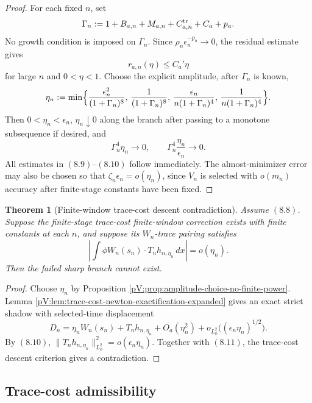 \documentclass[11pt]{article}
\numberwithin{equation}{section}
\theoremstyle{plain}
\newtheorem{theorem}{Theorem}[section]
\theoremstyle{definition}
\theoremstyle{remark}
\begin{document}
\begin{proof}
For each fixed \(n\), set
\[
        \Gamma_n:=1+B_{a,n}+M_{a,n}+C^{\rm tr}_{a,n}+C_a+p_a.
\]
No growth condition is imposed on \(\Gamma_n\).  Since \(\rho_n\epsilon_n^{-p_a}\to0\), the residual estimate gives
\[
        r_{a,n}(\eta)\le C_a'\eta
\]
for large \(n\) and \(0<\eta<1\).  Choose the explicit amplitude, after \(\Gamma_n\) is known,
\[
        \eta_n
        :=\min\Bigl\{
        \frac{\epsilon_n^2}{(1+\Gamma_n)^8},\,
        \frac{1}{(1+\Gamma_n)^8},\,
        \frac{\epsilon_n}{n(1+\Gamma_n)^4},\,
        \frac{1}{n(1+\Gamma_n)^4}
        \Bigr\}.
\]
Then \(0<\eta_n<\epsilon_n\), \(\eta_n\downarrow0\) along the branch after passing to a monotone subsequence if desired, and
\[
        \Gamma_n^4\eta_n\to0,
        \qquad
        \Gamma_n^4\frac{\eta_n}{\epsilon_n}\to0.
\]
All estimates in \((8.9)\)--\((8.10)\) follow immediately.  The almost-minimizer error may also be chosen so that \(\zeta_n\epsilon_n=o(\eta_n)\), since \(V_n\) is selected with \(o(m_n)\) accuracy after finite-stage constants have been fixed.
\end{proof}

\begin{theorem}[Finite-window trace-cost descent contradiction]
\label{pV:thm:finite-window-trace-cost-descent-expanded}
Assume \((8.8)\).  Suppose the finite-stage trace-cost finite-window correction exists with finite constants at each \(n\), and suppose its \(W_n\)-trace pairing satisfies
\[
        \left|
        \int\phi W_n(s_n)\cdot T_nh_{n,\eta_n}\,dx
        \right|=o(\eta_n).
        \tag{8.11}
\]
Then the failed sharp branch cannot exist.
\end{theorem}

\begin{proof}
Choose \(\eta_n\) by Proposition \ref{pV:prop:amplitude-choice-no-finite-power}.  Lemma \ref{pV:lem:trace-cost-newton-exactification-expanded} gives an exact strict shadow with selected-time displacement
\[
        D_n=\eta_n W_n(s_n)+T_nh_{n,\eta_n}+O_a(\eta_n^2)+o_{L^2_\phi}\bigl((\epsilon_n\eta_n)^{1/2}\bigr).
\]
By \((8.10)\), \(\|T_nh_{n,\eta_n}\|_{L^2_\phi}^2=o(\epsilon_n\eta_n)\).  Together with \((8.11)\), the trace-cost descent criterion gives a contradiction.
\end{proof}

\subsection{Trace-cost admissibility}
\end{document}
